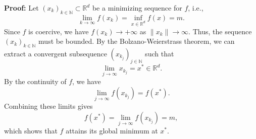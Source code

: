 \textbf{Proof:} Let \((x_k)_{k \in \mathbb{N}} \subset \mathbb{R}^d\) be a minimizing sequence for \(f\), i.e.,
    \[
    \lim_{k \to \infty} f(x_k) = \inf_{x \in \mathbb{R}^d} f(x) = m.
    \]
    Since \(f\) is coercive, we have \(f(x_k) \to +\infty\) as \(\|x_k\| \to \infty\). Thus, the sequence \((x_k)_{k \in \mathbb{N}}\) must be bounded. By the Bolzano-Weierstrass theorem, we can extract a convergent subsequence \((x_{k_j})_{j \in \mathbb{N}}\) such that
    \[
    \lim_{j \to \infty} x_{k_j} = x^* \in \mathbb{R}^d.
    \]
    By the continuity of \(f\), we have
    \[
    \lim_{j \to \infty} f(x_{k_j}) = f(x^*).
    \]
    Combining these limits gives
    \[
    f(x^*) = \lim_{j \to \infty} f(x_{k_j}) = m,
    \]
    which shows that \(f\) attains its global minimum at \(x^*\).